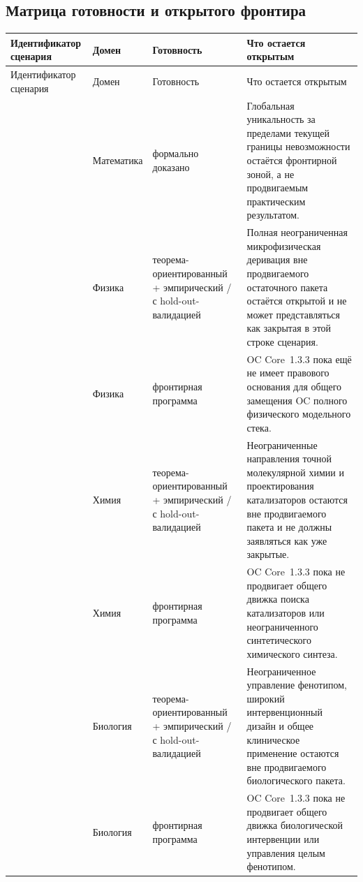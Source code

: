 \subsection{Матрица готовности и открытого фронтира}
\begin{longtable}{@{}L{0.15\textwidth}L{0.12\textwidth}L{0.13\textwidth}L{0.50\textwidth}@{}}
\toprule
Идентификатор сценария & Домен & Готовность & Что остается открытым \\
\midrule
\endfirsthead
\toprule
Идентификатор сценария & Домен & Готовность & Что остается открытым \\
\midrule
\endhead
{} & Математика & формально доказано & Глобальная уникальность за пределами текущей границы невозможности остаётся фронтирной зоной, а не продвигаемым практическим результатом. \\
 & Физика & теорема-ориентированный + эмпирический / с hold-out-валидацией & Полная неограниченная микрофизическая деривация вне продвигаемого остаточного пакета остаётся открытой и не может представляться как закрытая в этой строке сценария. \\
 & Физика & фронтирная программа & OC Core~1.3.3 пока ещё не имеет правового основания для общего замещения OC полного физического модельного стека. \\
 & Химия & теорема-ориентированный + эмпирический / с hold-out-валидацией & Неограниченные направления точной молекулярной химии и проектирования катализаторов остаются вне продвигаемого пакета и не должны заявляться как уже закрытые. \\
 & Химия & фронтирная программа & OC Core~1.3.3 пока не продвигает общего движка поиска катализаторов или неограниченного синтетического химического синтеза. \\
 & Биология & теорема-ориентированный + эмпирический / с hold-out-валидацией & Неограниченное управление фенотипом, широкий интервенционный дизайн и общее клиническое применение остаются вне продвигаемого биологического пакета. \\
 & Биология & фронтирная программа & OC Core~1.3.3 пока не продвигает общего движка биологической интервенции или управления целым фенотипом. \\

\end{longtable}
